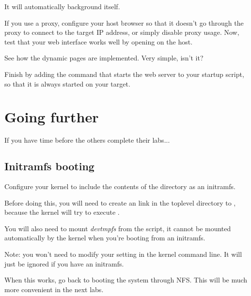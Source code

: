 
It will automatically background itself.

If you use a proxy, configure your host browser so that it doesn't go
through the proxy to connect to the target IP address, or simply
disable proxy usage.  Now, test that your web interface works well by
opening  on the host.

See how the dynamic pages are implemented. Very simple, isn't it?

Finish by adding the command that starts the web server to your
startup script, so that it is always started on your target.

\section{Going further}

If you have time before the others complete their labs...

\subsection{Initramfs booting}

Configure your kernel to include the contents of the 
directory as an initramfs.

Before doing this, you will need to create an  link in the
toplevel directory to , because the kernel will try to
execute .

You will also need to mount {\em devtmpfs} from the  script,
it cannot be mounted automatically by the kernel when you're booting
from an initramfs.

Note: you won't need to modify your  setting in the kernel
command line. It will just be ignored if you have an initramfs.

When this works, go back to booting the system through NFS.
This will be much more convenient in the next labs.

